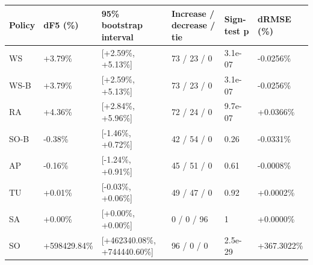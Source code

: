 \begin{tabular}{@{}llllll@{}}
\toprule
Policy & dF5 (\%) & 95\% bootstrap interval & Increase / decrease / tie & Sign-test p & dRMSE (\%) \\
\midrule
WS & +3.79\% & [+2.59\%, +5.13\%] & 73 / 23 / 0 & 3.1e-07 & -0.0256\% \\
WS-B & +3.79\% & [+2.59\%, +5.13\%] & 73 / 23 / 0 & 3.1e-07 & -0.0256\% \\
RA & +4.36\% & [+2.84\%, +5.96\%] & 72 / 24 / 0 & 9.7e-07 & +0.0366\% \\
SO-B & -0.38\% & [-1.46\%, +0.72\%] & 42 / 54 / 0 & 0.26 & -0.0331\% \\
AP & -0.16\% & [-1.24\%, +0.91\%] & 45 / 51 / 0 & 0.61 & -0.0008\% \\
TU & +0.01\% & [-0.03\%, +0.06\%] & 49 / 47 / 0 & 0.92 & +0.0002\% \\
SA & +0.00\% & [+0.00\%, +0.00\%] & 0 / 0 / 96 & 1 & +0.0000\% \\
SO & +598429.84\% & [+462340.08\%, +744440.60\%] & 96 / 0 / 0 & 2.5e-29 & +367.3022\% \\
\bottomrule
\end{tabular}
